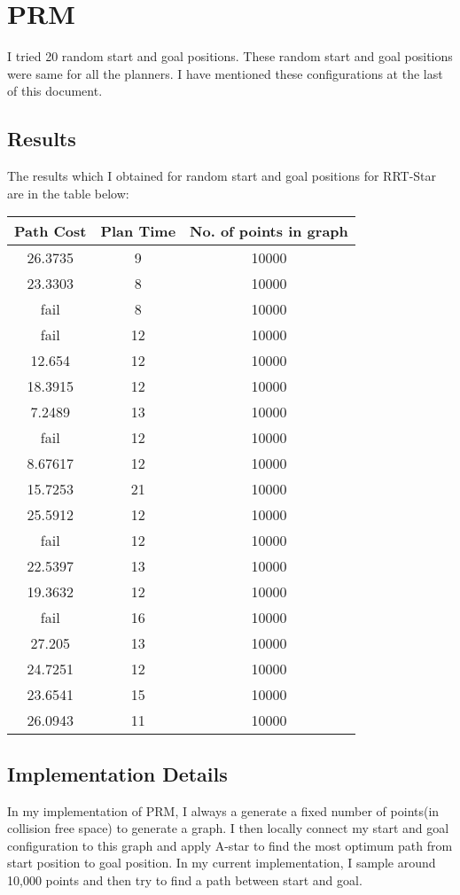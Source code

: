\documentclass[12pt]{article}
\begin{document}
\section{PRM}
I tried 20 random start and goal positions. These random start and goal positions were same for all the planners. I have mentioned these configurations at the last of this document. 

\subsection{Results}
The results which I obtained for random start and goal positions for RRT-Star are in the table below:

\begin{table}[h]
\centering
\begin{tabular}{|c|c|c|}
\hline
\textbf{Path Cost} & \textbf{Plan Time} & \textbf{No. of points in graph} \\ \hline
26.3735   & 9         & 10000       \\ \hline
23.3303   & 8         & 10000       \\ \hline
fail   & 8         & 10000       \\ \hline
fail  & 12        & 10000       \\ \hline
12.654    & 12        & 10000       \\ \hline
18.3915   & 12        & 10000       \\ \hline
7.2489    & 13        & 10000       \\ \hline
fail   & 12        & 10000       \\ \hline
8.67617   & 12        & 10000       \\ \hline
15.7253   & 21        & 10000       \\ \hline
25.5912   & 12        & 10000       \\ \hline
fail  & 12        & 10000       \\ \hline
22.5397   & 13        & 10000       \\ \hline
19.3632   & 12        & 10000       \\ \hline
fail   & 16        & 10000       \\ \hline
27.205    & 13        & 10000       \\ \hline
24.7251   & 12        & 10000       \\ \hline
23.6541   & 15        & 10000       \\ \hline
26.0943   & 11        & 10000       \\ \hline
\end{tabular}
\end{table}

\subsection{Implementation Details}
In my implementation of PRM, I always a generate a fixed number of points(in collision free space) to generate a graph. I then locally connect my start and goal configuration to this graph and apply A-star to find the most optimum path from start position to goal position. In my current implementation, I sample around 10,000 points and then try to find a path between start and goal.
\end{document}
